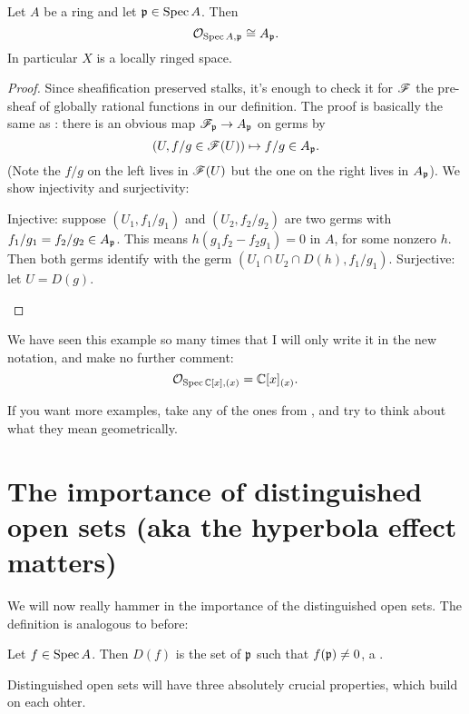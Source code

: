 \begin{theorem}
	Let $A$ be a ring and let $\mathfrak p \in \operatorname{Spec} A$.
	Then \[ \mathcal O_{\operatorname{Spec} A, \mathfrak p} \cong A_\mathfrak p. \]
	In particular $X$ is a locally ringed space.
\end{theorem}
\begin{proof}
	Since sheafification preserved stalks,
	it's enough to check it for $\mathscr F$ the pre-sheaf
	of globally rational functions in our definition.
	The proof is basically the same as :
	there is an obvious map $\mathscr F_\mathfrak p \to A_\mathfrak p$ on germs by
	\[ \left(U, f/g \in \mathscr F(U) \right)
		\mapsto f/g \in A_\mathfrak p . \]
	(Note the $f/g$ on the left lives in $\mathscr F(U)$
	but the one on the right lives in $A_\mathfrak p$).
	We show injectivity and surjectivity:
	\begin{itemize}
		\ii Injective: suppose $(U_1, f_1 / g_1)$ and $(U_2, f_2 / g_2)$
		are two germs with $f_1/g_1 = f_2/g_2 \in A_\mathfrak p$.
		This means $h(g_1 f_2 - f_2 g_1) = 0$ in $A$, for some nonzero $h$.
		Then both germs identify with
		the germ $(U_1 \cap U_2 \cap D(h), f_1 / g_1)$.
		\ii Surjective: let $U = D(g)$. \qedhere
	\end{itemize}
\end{proof}

\begin{example}
	We have seen this example so many times
	that I will only write it in the new notation,
	and make no further comment:
	\[ \mathcal O_{\operatorname{Spec} \mathbb C[x], (x)} = \mathbb C[x]_{(x)}. \]
\end{example}

If you want more examples,
take any of the ones from ,
and try to think about what they mean geometrically.

\section{The importance of distinguished open sets (aka the hyperbola effect matters)}

We will now really hammer in the importance of
the distinguished open sets.
The definition is analogous to before:
\begin{definition}
	Let $f \in \operatorname{Spec} A$.
	Then $D(f)$ is the set of $\mathfrak p$ such that $f(\mathfrak p) \neq 0$,
	a .
\end{definition}
Distinguished open sets will have three absolutely crucial properties,
which build on each ohter.

